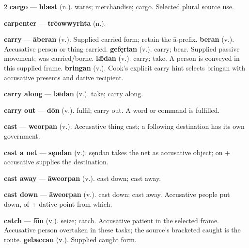 \begin{multicols}{2}
\textbf{cargo} — \textbf{hlæst} (n.). wares; merchandise; cargo. Selected plural source use.\par
\textbf{carpenter} — \textbf{trēowwyrhta} (n.).\par
\textbf{carry} — \textbf{āberan} (v.). Supplied carried form; retain the ā-prefix. \textbf{beran} (v.). Accusative person or thing carried. \textbf{gefęrian} (v.). carry; bear. Supplied passive movement; was carried/borne. \textbf{lǣdan} (v.). carry; take. A person is conveyed in this supplied frame. \textbf{bringan} (v.). Cook's explicit carry hint selects bringan with accusative presents and dative recipient.\par
\textbf{carry along} — \textbf{lǣdan} (v.). take; carry along.\par
\textbf{carry out} — \textbf{dōn} (v.). fulfil; carry out. A word or command is fulfilled.\par
\textbf{cast} — \textbf{weorpan} (v.). Accusative thing cast; a following destination has its own government.\par
\textbf{cast a net} — \textbf{sęndan} (v.). sęndan takes the net as accusative object; on + accusative supplies the destination.\par
\textbf{cast away} — \textbf{āweorpan} (v.). cast down; cast away.\par
\textbf{cast down} — \textbf{āweorpan} (v.). cast down; cast away. Accusative people put down, of + dative point from which.\par
\textbf{catch} — \textbf{fōn} (v.). seize; catch. Accusative patient in the selected frame. Accusative person overtaken in these tasks; the source's bracketed caught is the route. \textbf{gelǣccan} (v.). Supplied caught form.\par

\end{multicols}
